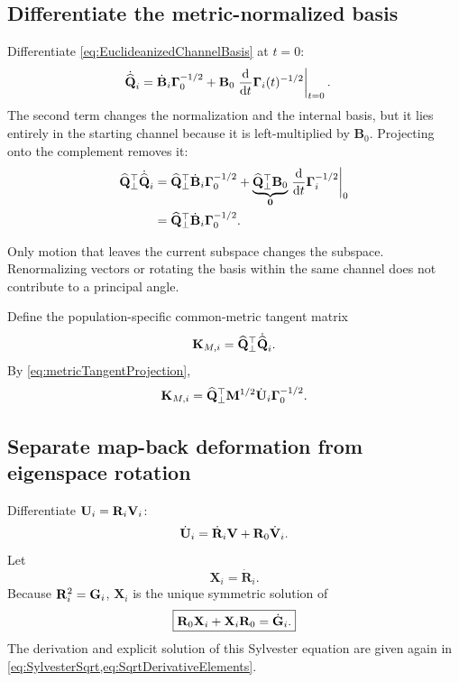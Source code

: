 \subsection{Differentiate the metric-normalized basis}

Differentiate \cref{eq:EuclideanizedChannelBasis} at \(t=0\):
\begin{align}
\dot{\widehat{\mathbf{Q}}}_i
&=\dot{\mathbf B}_i\boldsymbol\Gamma_0^{-1/2}
+\mathbf B_0
\left.\frac{\mathrm d}{\mathrm d t}\boldsymbol\Gamma_i(t)^{-1/2}\right|_{t=0}.
\label{eq:QhatDerivativeRaw}
\end{align}
The second term changes the normalization and the internal basis, but it lies entirely in the starting channel because it is left-multiplied by \(\mathbf B_0\). Projecting onto the complement removes it:
\begin{align}
\widehat{\mathbf{Q}}_{\perp}^{\top}\dot{\widehat{\mathbf{Q}}}_i
&=\widehat{\mathbf{Q}}_{\perp}^{\top}\dot{\mathbf B}_i
\boldsymbol\Gamma_0^{-1/2}
+\underbrace{\widehat{\mathbf{Q}}_{\perp}^{\top}\mathbf B_0}_{\mathbf{0}}
\left.\frac{\mathrm d}{\mathrm d t}\boldsymbol\Gamma_i^{-1/2}\right|_0\\
&=\widehat{\mathbf{Q}}_{\perp}^{\top}\dot{\mathbf B}_i
\boldsymbol\Gamma_0^{-1/2}.
\label{eq:metricTangentProjection}
\end{align}

\inwords Only motion that leaves the current subspace changes the subspace. Renormalizing vectors or rotating the basis within the same channel does not contribute to a principal angle.

Define the population-specific common-metric tangent matrix
\begin{equation}
\mathbf K_{M,i}
=\widehat{\mathbf{Q}}_{\perp}^{\top}\dot{\widehat{\mathbf{Q}}}_i.
\label{eq:KMiDefinition}
\end{equation}
By \cref{eq:metricTangentProjection},
\begin{equation}
\mathbf K_{M,i}
=\widehat{\mathbf{Q}}_{\perp}^{\top}\mathbf{M}^{1/2}\dot{\mathbf U}_i
\boldsymbol\Gamma_0^{-1/2}.
\label{eq:KMiFromUdot}
\end{equation}

\subsection{Separate map-back deformation from eigenspace rotation}

Differentiate \(\mathbf U_i=\mathbf R_i\mathbf{V}_i\):
\begin{equation}
\dot{\mathbf U}_i
=\dot{\mathbf R}_i\mathbf{V}+\mathbf R_0\dot{\mathbf{V}}_i.
\label{eq:UdotProductRule}
\end{equation}
Let
\begin{equation}
\mathbf X_i=\dot{\mathbf R}_i.
\end{equation}
Because \(\mathbf R_i^2=\mathbf{G}_i\), \(\mathbf X_i\) is the unique symmetric solution of
\begin{equation}
\boxed{
\mathbf R_0\mathbf X_i+\mathbf X_i\mathbf R_0=\dot{\mathbf{G}}_i.}
\label{eq:localSylvesterXi}
\end{equation}
The derivation and explicit solution of this Sylvester equation are given again in \cref{eq:SylvesterSqrt,eq:SqrtDerivativeElements}.

